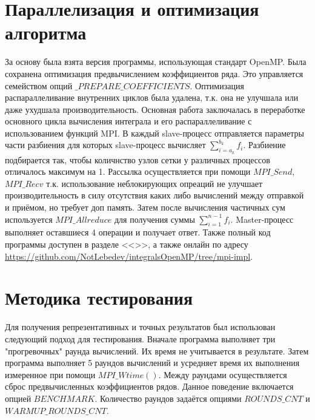 \documentclass[a4paper,12pt,titlepage,finall]{article}
\begin{document}
\section{Параллелизация и оптимизация алгоритма}
За основу была взята версия программы, использующая стандарт OpenMP. Была сохранена оптимизация предвычислением коэффициентов ряда. Это управляется семейством опций $\_PREPARE\_COEFFICIENTS$.  Оптимизация распараллеливание внутренних циклов была удалена, т.к. она не улучшала или даже ухудшала производительность. Основная работа заключалась в переработке основного цикла вычисления интеграла и его распараллеливание с использованием функций MPI. В каждый slave-процесс отправляется параметры части разбиения для которых slave-процесс вычисляет $\sum_{i=a_k}^{b_k} f_i$. Разбиение подбирается так, чтобы количнство узлов сетки у различных процессов отличалось максимум на 1. Рассылка осуществляется при помощи $MPI\_Send$, $MPI\_Recv$ т.к. использование неблокирующих опреаций не улучшает производительность в силу отсутствия каких либо вычислений между отправкой и приёмом, но требует доп память. Затем после вычисления частичных сум используется $MPI\_Allreduce$ для получения суммы $\sum_{i=1}^{n-1} f_i$. Master-процесс выполняет оставшиеся 4 операции и получает ответ. Также полный код программы доступен в разделе <<>>, а также онлайн по адресу \url{https://github.com/NotLebedev/integralsOpenMP/tree/mpi-impl}.

\section{Методика тестирования}
Для получения репрезентативных и точных результатов был использован следующий подход для тестирования. Вначале программа выполняет три "прогревочных" раунда вычислений. Их время не учитывается в результате. Затем программа выполняет 5 раундов вычислений и усредняет время их выполнения измеренное при помощи $MPI\_Wtime()$. Между раундами осуществляется сброс предвычисленных коэффициентов рядов. Данное поведение включается опцией $BENCHMARK$. Количество раундов задаётся опциями $ROUNDS\_CNT$ и $WARMUP\_ROUNDS\_CNT$.

\newpage
\end{document}
